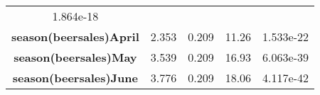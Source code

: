\documentclass[]{book}
\theoremstyle{definition}
\theoremstyle{definition}
\theoremstyle{remark}
\begin{document}
\begin{longtable}[c]{@{}ccccc@{}}
\begin{minipage}[t]{0.11\columnwidth}
1.864e-18
\strut\end{minipage}\tabularnewline
\begin{minipage}[t]{0.37\columnwidth}\centering\strut
\textbf{season(beersales)April}
\strut\end{minipage} &
\begin{minipage}[t]{0.12\columnwidth}\centering\strut
2.353
\strut\end{minipage} &
\begin{minipage}[t]{0.14\columnwidth}\centering\strut
0.209
\strut\end{minipage} &
\begin{minipage}[t]{0.11\columnwidth}\centering\strut
11.26
\strut\end{minipage} &
\begin{minipage}[t]{0.11\columnwidth}\centering\strut
1.533e-22
\strut\end{minipage}\tabularnewline
\begin{minipage}[t]{0.37\columnwidth}\centering\strut
\textbf{season(beersales)May}
\strut\end{minipage} &
\begin{minipage}[t]{0.12\columnwidth}\centering\strut
3.539
\strut\end{minipage} &
\begin{minipage}[t]{0.14\columnwidth}\centering\strut
0.209
\strut\end{minipage} &
\begin{minipage}[t]{0.11\columnwidth}\centering\strut
16.93
\strut\end{minipage} &
\begin{minipage}[t]{0.11\columnwidth}\centering\strut
6.063e-39
\strut\end{minipage}\tabularnewline
\begin{minipage}[t]{0.37\columnwidth}\centering\strut
\textbf{season(beersales)June}
\strut\end{minipage} &
\begin{minipage}[t]{0.12\columnwidth}\centering\strut
3.776
\strut\end{minipage} &
\begin{minipage}[t]{0.14\columnwidth}\centering\strut
0.209
\strut\end{minipage} &
\begin{minipage}[t]{0.11\columnwidth}\centering\strut
18.06
\strut\end{minipage} &
\begin{minipage}[t]{0.11\columnwidth}\centering\strut
4.117e-42
\strut\end{minipage}\tabularnewline

\end{longtable}
\end{document}
